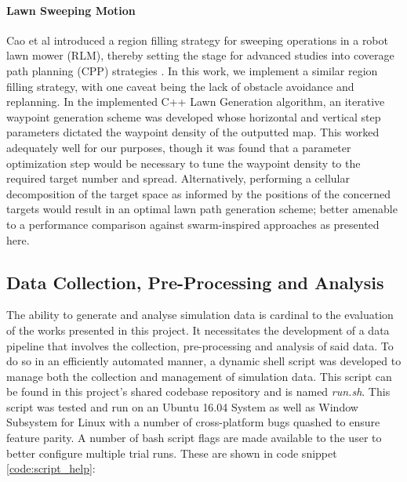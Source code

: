 \documentclass{report}
\begin{document}
\paragraph{Lawn Sweeping Motion}
Cao et al \cite{Cao1988} introduced a region filling strategy for sweeping operations in a robot lawn mower (RLM), thereby setting the stage for advanced studies into coverage path planning (CPP) strategies \cite{Galceran2013}. In this work, we implement a similar region filling strategy, with one caveat being the lack of obstacle avoidance and replanning. In the implemented C++ Lawn Generation algorithm, an iterative waypoint generation scheme was developed whose horizontal and vertical step parameters dictated the waypoint density of the outputted map. This worked adequately well for our purposes, though it was found that a parameter optimization step would be necessary to tune the waypoint density to the required target number and spread. Alternatively, performing a cellular decomposition of the target space as informed by the positions of the concerned targets would result in an optimal lawn path generation scheme; better amenable to a performance comparison against swarm-inspired approaches as presented here.

\newpage

\subsection{Data Collection, Pre-Processing and Analysis}
The ability to generate and analyse simulation data is cardinal to the evaluation of the works presented in this project. It necessitates the development of a data pipeline that involves the collection, pre-processing and analysis of said data. To do so in an efficiently automated manner, a dynamic shell script was developed to manage both the collection and management of simulation data. This script can be found in this project's shared codebase repository \cite{SWARMCODE} and is named \textit{run.sh}. This script was tested and run on an Ubuntu 16.04 System as well as Window Subsystem for Linux with a number of cross-platform bugs quashed to ensure feature parity. A number of bash script flags are made available to the user to better configure multiple trial runs. These are shown in code snippet \ref{code:script_help}:
\end{document}
